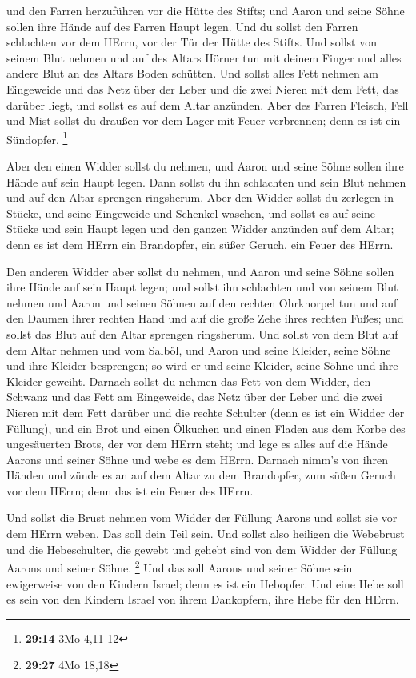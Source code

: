 und den Farren herzuführen vor die Hütte des Stifts; und
Aaron und seine Söhne sollen ihre Hände auf des Farren Haupt legen.
 Und du sollst den Farren schlachten vor dem HErrn, vor der
Tür der Hütte des Stifts.  Und sollst von seinem Blut
nehmen und auf des Altars Hörner tun mit deinem Finger und alles andere
Blut an des Altars Boden schütten.  Und sollst alles Fett
nehmen am Eingeweide und das Netz über der Leber und die zwei Nieren mit
dem Fett, das darüber liegt, und sollst es auf dem Altar anzünden.
 Aber des Farren Fleisch, Fell und Mist sollst du draußen
vor dem Lager mit Feuer verbrennen; denn es ist ein Sündopfer.
\footnote{\textbf{29:14} 3Mo 4,11-12}

 Aber den einen Widder sollst du nehmen, und Aaron und
seine Söhne sollen ihre Hände auf sein Haupt legen.  Dann
sollst du ihn schlachten und sein Blut nehmen und auf den Altar sprengen
ringsherum.  Aber den Widder sollst du zerlegen in Stücke,
und seine Eingeweide und Schenkel waschen, und sollst es auf seine
Stücke und sein Haupt legen  und den ganzen Widder anzünden
auf dem Altar; denn es ist dem HErrn ein Brandopfer, ein süßer Geruch,
ein Feuer des HErrn.

 Den anderen Widder aber sollst du nehmen, und Aaron und
seine Söhne sollen ihre Hände auf sein Haupt legen;  und
sollst ihn schlachten und von seinem Blut nehmen und Aaron und seinen
Söhnen auf den rechten Ohrknorpel tun und auf den Daumen ihrer rechten
Hand und auf die große Zehe ihres rechten Fußes; und sollst das Blut auf
den Altar sprengen ringsherum.  Und sollst von dem Blut auf
dem Altar nehmen und vom Salböl, und Aaron und seine Kleider, seine
Söhne und ihre Kleider besprengen; so wird er und seine Kleider, seine
Söhne und ihre Kleider geweiht.  Darnach sollst du nehmen
das Fett von dem Widder, den Schwanz und das Fett am Eingeweide, das
Netz über der Leber und die zwei Nieren mit dem Fett darüber und die
rechte Schulter (denn es ist ein Widder der Füllung),  und
ein Brot und einen Ölkuchen und einen Fladen aus dem Korbe des
ungesäuerten Brots, der vor dem HErrn steht;  und lege es
alles auf die Hände Aarons und seiner Söhne und webe es dem HErrn.
 Darnach nimm's von ihren Händen und zünde es an auf dem
Altar zu dem Brandopfer, zum süßen Geruch vor dem HErrn; denn das ist
ein Feuer des HErrn.

 Und sollst die Brust nehmen vom Widder der Füllung Aarons
und sollst sie vor dem HErrn weben. Das soll dein Teil sein.
 Und sollst also heiligen die Webebrust und die
Hebeschulter, die gewebt und gehebt sind von dem Widder der Füllung
Aarons und seiner Söhne. \footnote{\textbf{29:27} 4Mo 18,18}
 Und das soll Aarons und seiner Söhne sein ewigerweise von
den Kindern Israel; denn es ist ein Hebopfer. Und eine Hebe soll es sein
von den Kindern Israel von ihrem Dankopfern, ihre Hebe für den HErrn.

